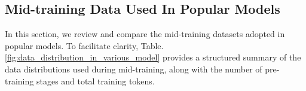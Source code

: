 














\subsection{Mid-training Data Used In Popular Models}
In this section, we review and compare the mid-training datasets adopted in popular models. To facilitate clarity, Table.\ref{fig:data_distribution_in_various_model} provides a structured summary of the data distributions used during mid-training, along with the number of pre-training stages and total training tokens.

